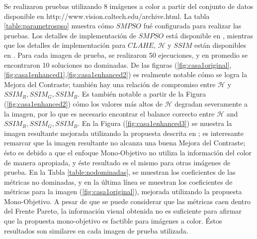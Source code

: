 Se realizaron pruebas utilizando 8 imágenes a color a partir del conjunto de datos disponible en http://www.vision.caltech.edu/archive.html. La tabla \ref{table:parametrospso} muestra cómo $SMPSO$ fué configurada para realizar las pruebas. Los detalles de implementación de $SMPSO$ está disponible en \cite{durillo2010jmetal}, mientras que los detalles de implementación para $CLAHE$, $\mathscr{H}$ y $SSIM$ están disponibles en \cite{bradski2000opencv}. Para cada imagen de prueba, se realizaron 50 ejecuciones, y en promedio se encontraron 10 soluciones no dominadas. De las figuras (\ref{fig:casa1original},\ref{fig:casa1enhanced1},\ref{fig:casa1enhanced2}) es realmente notable cómo se logra la Mejora del Contraste; también hay una relación de compromiso entre $\mathscr{H}$ y $SSIM_R,SSIM_G,SSIM_B$. Es también notable a partir de la Figura (\ref{fig:casa1enhanced2}) cómo los valores más altos de $\mathscr{H}$ degradan severamente a la imagen, por lo que es necesario encontrar el balance correcto entre $\mathscr{H}$ and $SSIM_R,SSIM_G,SSIM_B$. En la Figura (\ref{fig:casa1enhanced3}) se muestra la imagen resultante mejorada utilizando la propuesta descrita en \cite{morepso}; es interesante remarcar que la imagen resultante no alcanza una buena Mejora del Contraste; ésto es debido a que el enfoque Mono-Objetivo no utiliza la información del color de manera apropiada, y éste resultado es el mismo para otras imágenes de prueba. En la Tabla \ref{table:nodominadas}, se muestran los coeficientes de las métricas no dominadas, y en la última línea se muestran los coeficientes de métricas para la imagen (\ref{fig:casa1original}), mejorada utilizando la propuesta Mono-Objetivo. A pesar de que se puede considerar que las métricas caen dentro del Frente Pareto, la información visual obtenida no es suficiente para afirmar que la propuesta mono-objetivo es factible para imágenes a color. Éstos resultados son similares en cada imagen de prueba utilizada.

